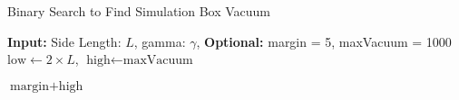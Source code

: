 \begin{algorithm}[htbp]
\caption{Binary Search to Find Simulation Box Vacuum}
\label{alg:vacuum}
\textbf{Input:} Side Length: $L$, gamma: $\gamma$, \textbf{Optional: }margin = 5, maxVacuum = 1000 \\
$\text{low} \gets 2 \times L$,
$\text{high} \gets \text{maxVacuum}$

\Return $\text{margin} + \text{high} $\;
\end{algorithm}